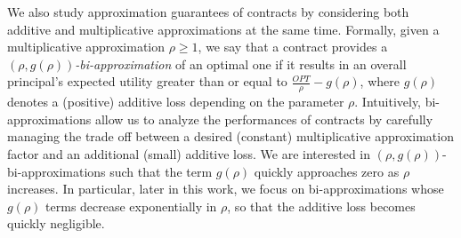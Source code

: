 We also study approximation guarantees of contracts by considering both additive and multiplicative approximations at the same time.
%
Formally, given a multiplicative approximation $\rho \geq 1$, we say that a contract provides a $\left( \rho, g(\rho) \right)$\emph{-bi-approximation} of an optimal one if it results in an overall principal's expected utility greater than or equal to $\frac{OPT}{\rho} - g(\rho)$, where $g(\rho)$ denotes a (positive) additive loss depending on the parameter $\rho$.
%
Intuitively, bi-approximations allow us to analyze the performances of contracts by carefully managing the trade off between a desired (constant) multiplicative approximation factor and an additional (small) additive loss.
%
We are interested in $\left( \rho, g(\rho) \right)$-bi-approximations such that the term $g(\rho)$ quickly approaches zero as $\rho$ increases.
%
In particular, later in this work, we focus on bi-approximations whose $g(\rho)$ terms decrease exponentially in $\rho$, so that the additive loss becomes quickly negligible. 



%
%

